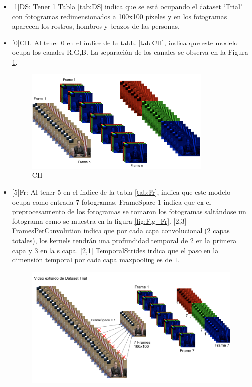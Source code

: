 \begin{onehalfspacing}
 \begin{itemize}
     \item {[1]DS}: Tener 1 Tabla \ref{tab:DS} indica que se está ocupando el dataset `Trial' con fotogramas redimensionados a 100x100 píxeles y en los fotogramas aparecen los rostros, hombros y brazos de las personas.
     \item {[0]CH}: Al tener 0 en el índice de la tabla \ref{tab:CH}, indica que este modelo ocupa los canales R,G,B. La separación de los canales se observa en la Figura \ref{fig:Fig_CH}.
     \begin{figure}[h!]
    	\centering
    	\includegraphics[width=9cm,keepaspectratio]{XX_Figures/Fig_Fr.png}
    	\caption{\footnotesize CH}
    	\label{fig:Fig_CH}
    \end{figure}
     \item {[5]Fr}: Al tener 5 en el índice de la tabla \ref{tab:Fr}, indica que este modelo ocupa como entrada 7 fotogramas. FrameSpace 1 indica que en el preprocesamiento de los fotogramas se tomaron los fotogramas saltándose un fotograma como se muestra en la figura \ref{fig:Fig_Fr}. [2,3] FramesPerConvolution indica que por cada capa convolucional (2 capas totales), los kernels tendrán una profundidad temporal de 2 en la primera capa y 3 en la s capa. [2,1] TemporalStrides indica que el paso en la dimensión temporal por cada capa maxpooling es de 1.
     \begin{figure}[h!]
    	\centering
    	\includegraphics[width=11cm,keepaspectratio]{XX_Figures/Fig_CH.png}

\end{figure}
\end{itemize}
\end{onehalfspacing}
